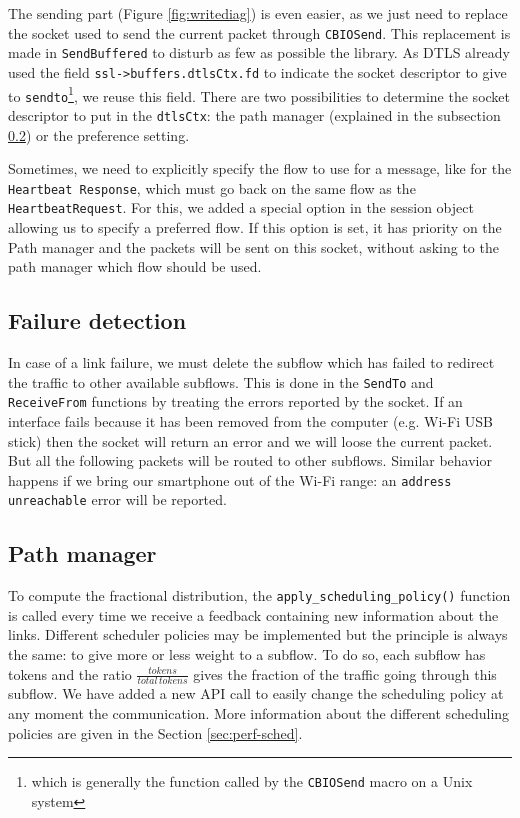 The sending part (Figure \ref{fig:writediag}) is even easier, as we just need to replace the socket used to send the current packet through \texttt{CBIOSend}. This replacement is made in \texttt{SendBuffered} to disturb as few as possible the library. As DTLS already used the field \texttt{ssl->buffers.dtlsCtx.fd} to indicate the socket descriptor to give to \texttt{sendto}\footnote{which is generally the function called by the \texttt{CBIOSend} macro on a Unix system}, we reuse this field. There are two possibilities to determine the socket descriptor to put in the \texttt{dtlsCtx}: the path manager (explained in the subsection \ref{ssec:pathmanager}) or the preference setting.

Sometimes, we need to explicitly specify the flow to use for a message, like for the \texttt{Heartbeat Response}, which must go back on the same flow as the \texttt{HeartbeatRequest}. For this, we added a special option in the session object allowing us to specify a preferred flow. If this option is set, it has priority on the Path manager and the packets will be sent on this socket, without asking to the path manager which flow should be used.

\subsection{Failure detection}

In case of a link failure, we must delete the subflow which has failed to redirect the traffic to other available subflows. This is done in the \texttt{SendTo} and \texttt{ReceiveFrom} functions by treating the errors reported by the socket. If an interface fails because it has been removed from the computer (e.g. Wi-Fi USB stick) then the socket will return an error and we will loose the current packet. But all the following packets will be routed to other subflows. Similar behavior happens if we bring our smartphone out of the Wi-Fi range: an \texttt{address unreachable} error will be reported.

\subsection{Path manager}\label{ssec:pathmanager}

To compute the fractional distribution, the \texttt{apply\_scheduling\_policy()} function is called every time we receive a feedback containing new information about the links. Different scheduler policies may be implemented but the principle is always the same: to give more or less weight to a subflow. To do so, each subflow has tokens and the ratio $\frac{tokens}{total\,tokens}$ gives the fraction of the traffic going through this subflow. We have added a new API call to easily change the scheduling policy at any moment the communication. More information about the different scheduling policies are given in the Section \ref{sec:perf-sched}.

